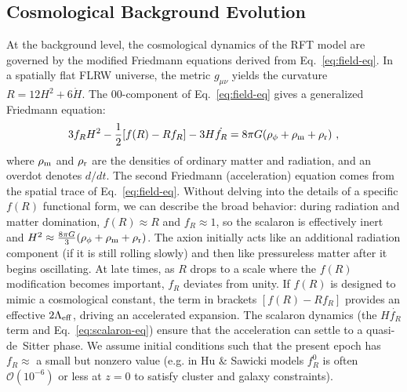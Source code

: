 \documentclass[11pt]{article}
\begin{document}
\subsection{Cosmological Background Evolution}
At the background level, the cosmological dynamics of the RFT model are governed by the modified Friedmann equations derived from Eq.~\eqref{eq:field-eq}. In a spatially flat FLRW universe, the metric $g_{\mu\nu}$ yields the curvature $R = 12H^2 + 6\dot{H}$. The $00$-component of Eq.~\eqref{eq:field-eq} gives a generalized Friedmann equation:
\begin{equation}\label{eq:friedmann}
3 f_R H^2 - \frac{1}{2}[f(R) - R f_R] - 3H \dot{f_R} = 8\pi G (\rho_{\phi} + \rho_{\rm m} + \rho_{\rm r})~,
\end{equation}
where $\rho_{\rm m}$ and $\rho_{\rm r}$ are the densities of ordinary matter and radiation, and an overdot denotes $d/dt$. The second Friedmann (acceleration) equation comes from the spatial trace of Eq.~\eqref{eq:field-eq}. Without delving into the details of a specific $f(R)$ functional form, we can describe the broad behavior: during radiation and matter domination, $f(R) \approx R$ and $f_R \approx 1$, so the scalaron is effectively inert and $H^2 \approx \frac{8\pi G}{3}(\rho_{\phi} + \rho_{\rm m} + \rho_{\rm r})$. The axion initially acts like an additional radiation component (if it is still rolling slowly) and then like pressureless matter after it begins oscillating. At late times, as $R$ drops to a scale where the $f(R)$ modification becomes important, $f_R$ deviates from unity. If $f(R)$ is designed to mimic a cosmological constant, the term in brackets $[f(R) - R f_R]$ provides an effective $2\Lambda_{\rm eff}$, driving an accelerated expansion. The scalaron dynamics (the $H \dot{f_R}$ term and Eq.~\eqref{eq:scalaron-eq}) ensure that the acceleration can settle to a quasi-de~Sitter phase. We assume initial conditions such that the present epoch has $f_R \approx$ a small but nonzero value (e.g. in Hu \& Sawicki models $f_R^0$ is often $\mathcal{O}(10^{-6})$ or less at $z=0$ to satisfy cluster and galaxy constraints).
\end{document}
